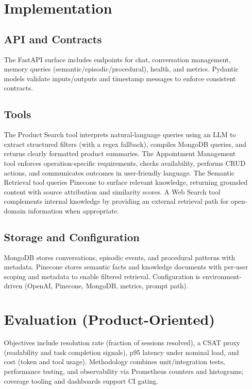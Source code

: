 \documentclass[11pt]{article}
\begin{document}
\section{Implementation}
\subsection{API and Contracts}
The FastAPI surface includes endpoints for chat, conversation management, memory queries (semantic/episodic/procedural), health, and metrics. Pydantic models validate inputs/outputs and timestamp messages to enforce consistent contracts.

\subsection{Tools}
The Product Search tool interprets natural-language queries using an LLM to extract structured filters (with a regex fallback), compiles MongoDB queries, and returns clearly formatted product summaries. The Appointment Management tool enforces operation-specific requirements, checks availability, performs CRUD actions, and communicates outcomes in user-friendly language. The Semantic Retrieval tool queries Pinecone to surface relevant knowledge, returning grounded content with source attribution and similarity scores. A Web Search tool complements internal knowledge by providing an external retrieval path for open-domain information when appropriate.

\subsection{Storage and Configuration}
MongoDB stores conversations, episodic events, and procedural patterns with metadata. Pinecone stores semantic facts and knowledge documents with per-user scoping and metadata to enable filtered retrieval. Configuration is environment-driven (OpenAI, Pinecone, MongoDB, metrics, prompt path).

\section{Evaluation (Product-Oriented)}
Objectives include resolution rate (fraction of sessions resolved), a CSAT proxy (readability and task completion signals), p95 latency under nominal load, and cost (token and tool usage). Methodology combines unit/integration tests, performance testing, and observability via Prometheus counters and histograms; coverage tooling and dashboards support CI gating.
\end{document}
